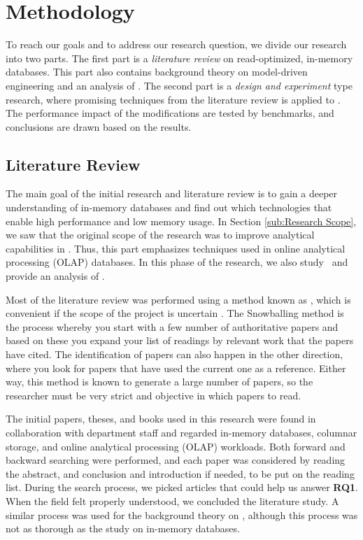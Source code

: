 \section{Methodology}
\label{sec:Methodology}
To reach our goals and to address our research question, we divide our research into two parts. The first part is a \textit{literature review} on read-optimized, in-memory databases. This part also contains background theory on model-driven engineering and an analysis of \gap. The second part is a \textit{design and experiment} type research, where promising techniques from the literature review is applied to \gap. The performance impact of the modifications are tested by benchmarks, and conclusions are drawn based on the results.

\subsection{Literature Review}
\label{sub:Literature Review}
The main goal of the initial research and literature review is to gain a deeper understanding of in-memory databases and find out which technologies that enable high performance and low memory usage. In Section \ref{sub:Research Scope}, we saw that the original scope of the research was to improve analytical capabilities in \gap. Thus, this part emphasizes techniques used in online analytical processing (OLAP) databases. In this phase of the research, we also study \mde~and provide an analysis of \gap.

Most of the literature review was performed using a method known as , which is convenient if the scope of the project is uncertain \cite{Ang2014-nm}. The Snowballing method is the process whereby you start with a few number of authoritative papers and based on these you expand your list of readings by relevant work that the papers have cited. The identification of papers can also happen in the other direction, where you look for papers that have used the current one as a reference. Either way, this method is known to generate a large number of papers, so the researcher must be very strict and objective in which papers to read.

The initial papers, theses, and books used in this research were found in collaboration with department staff and regarded in-memory databases, columnar storage, and online analytical processing (OLAP) workloads. Both forward and backward searching were performed, and each paper was considered by reading the abstract, and conclusion and introduction if needed, to be put on the reading list. During the search process, we picked articles that could help us answer \textbf{RQ1}. When the field felt properly understood, we concluded the literature study. A similar process was used for the background theory on \mde, although this process was not as thorough as the study on in-memory databases.

